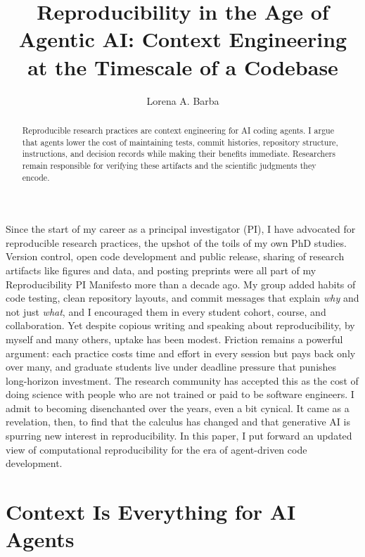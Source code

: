 \documentclass{IEEEcsmag}
\begin{document}
\title{Reproducibility in the Age of Agentic AI: Context Engineering at the Timescale of a Codebase}
\author{Lorena A. Barba}

\begin{abstract}
Reproducible research practices are context engineering for AI coding agents. I argue that agents lower the cost of maintaining tests, commit histories, repository structure, instructions, and decision records while making their benefits immediate. Researchers remain responsible for verifying these artifacts and the scientific judgments they encode.
\end{abstract}

\maketitle

Since the start of my career as a principal investigator (PI), I have advocated for reproducible research practices, the upshot of the toils of my own PhD studies.\cite{barba2016} Version control, open code development and public release, sharing of research artifacts like figures and data, and posting preprints were all part of my Reproducibility PI Manifesto more than a decade ago.\cite{barba2012} My group added habits of code testing, clean repository layouts, and commit messages that explain \emph{why} and not just \emph{what}, and I encouraged them in every student cohort, course, and collaboration. Yet despite copious writing and speaking about reproducibility, by myself and many others, uptake has been modest. Friction remains a powerful argument: each practice costs time and effort in every session but pays back only over many, and graduate students live under deadline pressure that punishes long-horizon investment. The research community has accepted this as the cost of doing science with people who are not trained or paid to be software engineers. I admit to becoming disenchanted over the years, even a bit cynical. It came as a revelation, then, to find that the calculus has changed and that generative AI is spurring new interest in reproducibility. In this paper, I put forward an updated view of computational reproducibility for the era of agent-driven code development.

\section{Context Is Everything for AI Agents}
\end{document}
